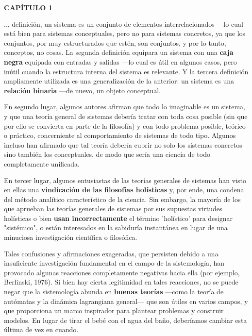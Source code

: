 \newpage
\fancyhf{}
\fancyhead[l]{\thepage} 
\begin{center}
{\fontsize{13}{16}\selectfont \textbf{CAPÍTULO 1}}
\end{center}
\vspace{0.5cm}

{\fontsize{13}{15}\selectfont
... definición, un sistema es un conjunto de elementos interrelacionados —lo cual está bien para sistemas conceptuales, pero no para sistemas concretos, ya que los conjuntos, por muy estructurados que estén, son conjuntos, y por lo tanto, conceptos, no cosas. La segunda definición equipara un sistema con una \textbf{caja negra} equipada con entradas y salidas —lo cual es útil en algunos casos, pero inútil cuando la estructura interna del sistema es relevante. Y la tercera definición ampliamente utilizada es una generalización de la anterior: un sistema es una \textbf{relación binaria} —de nuevo, un objeto conceptual.

En segundo lugar, algunos autores afirman que todo lo imaginable es un sistema, y que una teoría general de sistemas debería tratar con toda cosa posible (sin que por ello se convierta en parte de la filosofía) y con todo problema posible, teórico o práctico, concerniente al comportamiento de sistemas de todo tipo. Algunos incluso han afirmado que tal teoría debería cubrir no solo los sistemas concretos sino también los conceptuales, de modo que sería una ciencia de todo completamente unificada.

En tercer lugar, algunos entusiastas de las teorías generales de sistemas han visto en ellas una \textbf{vindicación de las filosofías holísticas} y, por ende, una condena del método analítico característico de la ciencia. Sin embargo, la mayoría de los que aprueban las teorías generales de sistemas por sus supuestas virtudes holísticas o bien \textbf{usan incorrectamente} el término 'holístico' para designar "sistémico", o están interesados en la sabiduría instantánea en lugar de una minuciosa investigación científica o filosófica.

Tales confusiones y afirmaciones exageradas, que persisten debido a una insuficiente investigación fundamental en el campo de la sistemología, han provocado algunas reacciones completamente negativas hacia ella (por ejemplo, Berlinski, 1976). Si bien hay cierta legitimidad en tales reacciones, no se puede negar que la sistemología abunda en \textbf{buenas teorías} —como la teoría de autómatas y la dinámica lagrangiana general— que son útiles en varios campos, y que proporciona un marco inspirador para plantear problemas y construir modelos. En lugar de tirar el bebé con el agua del baño, deberíamos cambiar esta última de vez en cuando.

}
